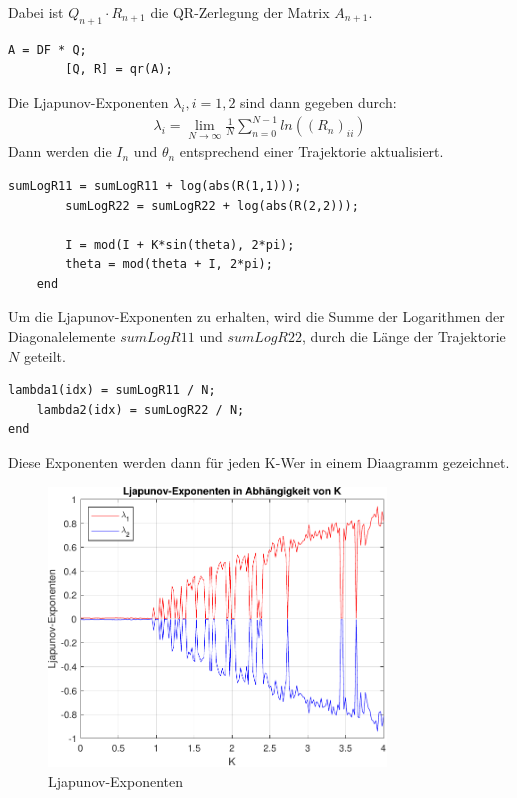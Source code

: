 \documentclass[paper=a4, 
                DIV=12]{scrartcl}
\begin{document}
Dabei ist $Q_{n+1} \cdot R_{n+1}$ die QR-Zerlegung der Matrix $A_{n+1}$.
\begin{lstlisting}[frame=single, style=Matlab-editor]
        A = DF * Q;
        [Q, R] = qr(A);
\end{lstlisting}
\newpage
Die Ljapunov-Exponenten $\lambda_i, i = 1,2$ sind dann gegeben durch:
\begin{gather*}
    \lambda_i = \lim_{N\to\infty}\frac{1}{N}\sum_{n=0}^{N-1}ln((R_n)_{ii})
\end{gather*}
Dann werden die $I_n$ und $\theta_n$ entsprechend einer Trajektorie aktualisiert.
\begin{lstlisting}[frame=single, style=Matlab-editor]
        sumLogR11 = sumLogR11 + log(abs(R(1,1)));
        sumLogR22 = sumLogR22 + log(abs(R(2,2)));

        I = mod(I + K*sin(theta), 2*pi);
        theta = mod(theta + I, 2*pi);
    end
\end{lstlisting}
Um die Ljapunov-Exponenten zu erhalten, wird die Summe der Logarithmen der Diagonalelemente $sumLogR11$ und $sumLogR22$, durch die Länge der Trajektorie $N$ geteilt. 
\begin{lstlisting}[frame=single, style=Matlab-editor]
    lambda1(idx) = sumLogR11 / N;
    lambda2(idx) = sumLogR22 / N;
end
\end{lstlisting}
Diese Exponenten werden dann für jeden K-Wer in einem Diaagramm gezeichnet.
\begin{figure}[H]
    \centering
    \includegraphics[width=0.8\textwidth]{figures/exponenten.pdf}
    \caption{Ljapunov-Exponenten}
\end{figure}
\end{document}
